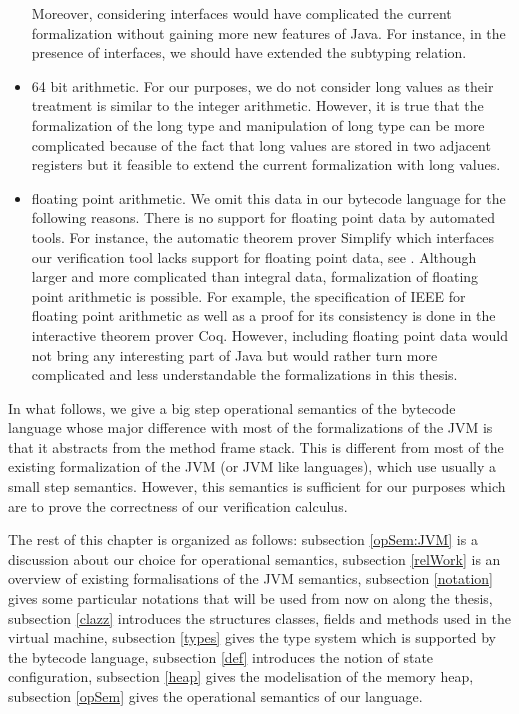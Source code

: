 \begin{itemize}
	 Moreover, considering interfaces would have complicated the current formalization 
	 without gaining more new features of Java. 
	 For instance, in the presence of interfaces, we should have extended 
	 the subtyping relation. 

   \item 64 bit arithmetic.  For our purposes, we do not consider  
	  long values as their treatment is similar to the integer arithmetic.
	  However, it is true that the formalization of the long type and manipulation of long type can be more complicated because
	  of the fact that long values are stored in two adjacent registers but it feasible to extend the current formalization 
	  with long values.

   \item floating point arithmetic. We omit this data in our bytecode language for the following reasons.
	 There is no support for floating point data by automated tools.  
	 For instance, the automatic theorem prover Simplify which interfaces our verification tool
	 lacks support for floating point data, see  \cite{ESC2000LNS}. 
	 Although larger and more complicated than integral data, formalization of floating point arithmetic is possible. 
	 For example, the specification of IEEE  for floating point
	 arithmetic as well as a proof for its consistency  is done in the interactive
	 theorem prover Coq. 
	 However, including floating point data would not
	 bring any interesting part of Java but would rather turn more complicated
	 and less understandable the formalizations in this thesis.
	  
	  
	 
	 
   
         
 \end{itemize}

 

 In what follows, we give a big step operational semantics of the bytecode language whose major difference with most of the formalizations
 of the JVM is that it abstracts from the method frame stack. This is different from most of the existing formalization of the JVM (or JVM like languages),
 which use usually a small step semantics. However, this semantics
 is sufficient for our purposes which are to prove the correctness of our verification calculus.  


  
 The rest of this chapter is organized as follows:
 subsection \ref{opSem:JVM} is a discussion about our choice for operational semantics,
 subsection \ref{relWork} is an overview of existing formalisations of the JVM semantics,
 subsection \ref{notation} gives some particular notations that will be used from now on along the thesis,
 subsection \ref{clazz} introduces the structures classes, fields and methods  used in the virtual machine, 
 subsection \ref{types} gives the type system which is supported by the bytecode language,
 subsection \ref{def} introduces the notion of state configuration,
 subsection \ref{heap} gives the modelisation of the memory heap,
 subsection \ref{opSem} gives the operational semantics of our language.

